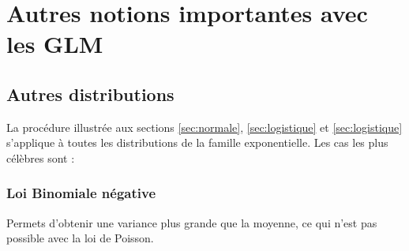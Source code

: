 \documentclass[11pt,french]{report}
\begin{document}
\section{Autres notions importantes avec les GLM}
\subsection{Autres distributions}
La procédure illustrée aux sections \ref{sec:normale}, \ref{sec:logistique} et \ref{sec:logistique} s'applique à toutes les distributions de la famille exponentielle. Les cas les plus célèbres sont :

\subsubsection{Loi Binomiale négative}
Permets d'obtenir une variance plus grande que la moyenne, ce qui n'est pas possible avec la loi de Poisson.
\end{document}
